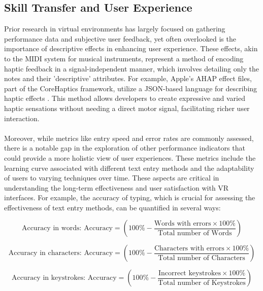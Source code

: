 \subsection{Skill Transfer and User Experience}
\label{sec:Skill Transfer and User Experience}

Prior research in virtual environments has largely focused on gathering performance data and subjective user feedback, yet often overlooked is the importance of descriptive effects in enhancing user experience. These effects, akin to the MIDI system for musical instruments, represent a method of encoding haptic feedback in a signal-independent manner, which involves detailing only the notes and their 'descriptive' attributes. For example, Apple’s AHAP effect files, part of the CoreHaptics framework, utilize a JSON-based language for describing haptic effects \cite{appleCoreHaptics}. This method allows developers to create expressive and varied haptic sensations without needing a direct motor signal, facilitating richer user interaction. \\ \\ 
Moreover, while metrics like entry speed and error rates are commonly assessed, there is a notable gap in the exploration of other performance indicators that could provide a more holistic view of user experiences. These metrics include the learning curve associated with different text entry methods and the adaptability of users to varying techniques over time. These aspects are critical in understanding the long-term effectiveness and user satisfaction with \ac{VR} interfaces. For example, the accuracy of typing, which is crucial for assessing the effectiveness of text entry methods, can be quantified in several ways:

\begin{equation}
\text{Accuracy in words: } \text{Accuracy} = \left(100\% - \frac{\text{Words with errors} \times 100\%}{\text{Total number of Words}}\right)
\end{equation}

\begin{equation}
\text{Accuracy in characters: } \text{Accuracy} = \left(100\% - \frac{\text{Characters with errors} \times 100\%}{\text{Total number of Characters}}\right)
\end{equation}

\begin{equation}
\text{Accuracy in keystrokes: } \text{Accuracy} = \left(100\% - \frac{\text{Incorrect keystrokes} \times 100\%}{\text{Total number of Keystrokes}}\right)
\end{equation}

